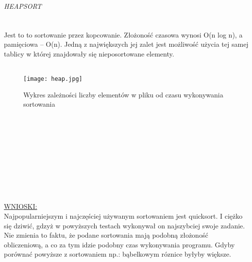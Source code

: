 \documentclass[11pt]{article}
\begin{document}
\textit{HEAPSORT}
\\ \\ \\
Jest to to sortowanie przez kopcowanie. Złożoność czasowa wynosi  O(n log n), a pamięciowa – O(n). Jedną z największych jej zalet jest możliwość użycia tej samej tablicy w której znajdowały się nieposortowane elementy.
\\ \\
\begin{figure}[ht!]
\centering
\texttt{[image: heap.jpg]}
\caption{Wykres zależności liczby elementów w pliku od czasu wykonywania sortowania}
\label{overflow}
\end{figure}
\\
\\ \\ \\ \\ \\ \\ \\ \\

\underline {WNIOSKI:} \\
Najpopularniejszym i najczęściej używanym sortowaniem jest quicksort. I ciężko się dziwić, gdzyż w powyższych testach wykonywał on najszybciej swoje zadanie. Nie zmienia to faktu, że podane sortowania mają podobną złożoność obliczeniową, a co za tym idzie podobny czas wykonywania programu. Gdyby porównać powyższe z sortowaniem np.: bąbelkowym róznice byłyby większe.
\end{document}
